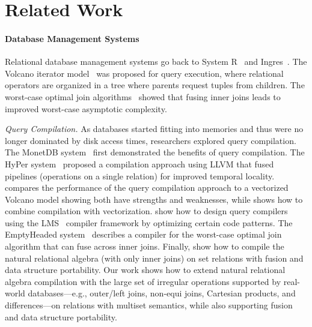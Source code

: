 \documentclass[acmsmall,screen,nonacm]{acmart}\settopmatter{printfolios=true,printccs=false,printacmref=false}
\begin{document}
\section{Related Work}
\label{sec:related-work}

\paragraph{Database Management Systems}

Relational database management systems go back to System R~\cite{chamberlin1981} and Ingres~\cite{stonebraker1976}. The Volcano iterator model~\cite{volcano} was proposed for query execution, where relational operators are organized in a tree where parents request tuples from children.  The worst-case optimal join algorithms~\cite{ngo-skew,leapfrog-triejoin} showed that fusing inner joins leads to improved worst-case asymptotic complexity.

\emph{Query Compilation.}
As databases started fitting into memories and thus were no longer dominated by disk access times, researchers explored query compilation. The MonetDB system~\cite{monetdb} first demonstrated the benefits of query compilation. The HyPer system~\cite{hyper} proposed a compilation approach using LLVM that fused pipelines (operations on a single relation) for improved temporal locality. \citet{kersten2018} compares the performance of the query compilation approach to a vectorized Volcano model showing both have strengths and weaknesses, while \citet{menon2017} shows how to combine compilation with vectorization. \citet{klonatos2014} show how to design query compilers using the LMS~\cite{lms} compiler framework by optimizing certain code patterns. The EmptyHeaded system~\cite{emptyheaded} describes a compiler for the worst-case optimal join algorithm that can fuse across inner joins. Finally, \citet{indexed-streams} show how to compile the natural relational algebra (with only inner joins) on set relations with fusion and data structure portability. Our work shows how to extend natural relational algebra compilation with the large set of irregular operations supported by real-world databases---e.g., outer/left joins, non-equi joins, Cartesian products, and differences---on relations with multiset semantics, while also supporting fusion and data structure portability.
\end{document}
